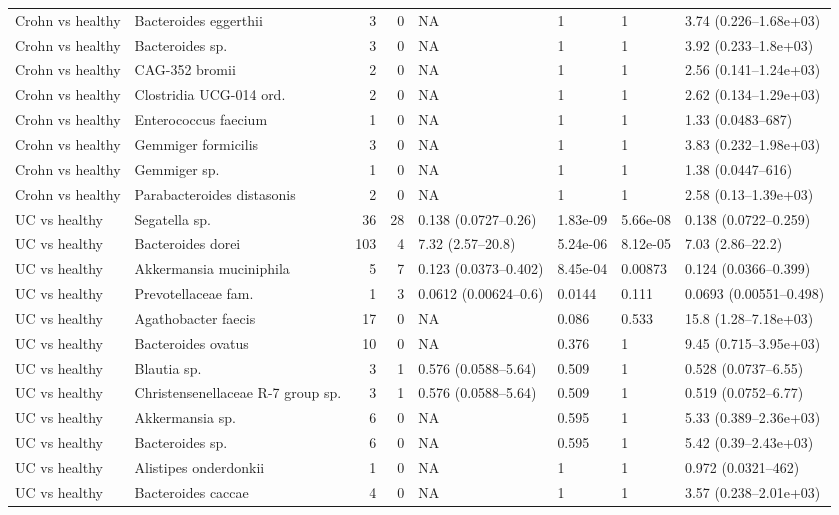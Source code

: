 \begin{longtable}{@{} p{} p{} r r p{} p{} p{} p{} @{}}
Crohn vs healthy & Bacteroides eggerthii & 3 & 0 & NA & 1 & 1 & 3.74 (0.226--1.68e+03) \\
Crohn vs healthy & Bacteroides sp. & 3 & 0 & NA & 1 & 1 & 3.92 (0.233--1.8e+03) \\
Crohn vs healthy & CAG-352 bromii & 2 & 0 & NA & 1 & 1 & 2.56 (0.141--1.24e+03) \\
Crohn vs healthy & Clostridia UCG-014 ord. & 2 & 0 & NA & 1 & 1 & 2.62 (0.134--1.29e+03) \\
Crohn vs healthy & Enterococcus faecium & 1 & 0 & NA & 1 & 1 & 1.33 (0.0483--687) \\
Crohn vs healthy & Gemmiger formicilis & 3 & 0 & NA & 1 & 1 & 3.83 (0.232--1.98e+03) \\
Crohn vs healthy & Gemmiger sp. & 1 & 0 & NA & 1 & 1 & 1.38 (0.0447--616) \\
Crohn vs healthy & Parabacteroides distasonis & 2 & 0 & NA & 1 & 1 & 2.58 (0.13--1.39e+03) \\
UC vs healthy & Segatella sp. & 36 & 28 & 0.138 (0.0727--0.26) & 1.83e-09 & 5.66e-08 & 0.138 (0.0722--0.259) \\
UC vs healthy & Bacteroides dorei & 103 & 4 & 7.32 (2.57--20.8) & 5.24e-06 & 8.12e-05 & 7.03 (2.86--22.2) \\
UC vs healthy & Akkermansia muciniphila & 5 & 7 & 0.123 (0.0373--0.402) & 8.45e-04 & 0.00873 & 0.124 (0.0366--0.399) \\
UC vs healthy & Prevotellaceae fam. & 1 & 3 & 0.0612 (0.00624--0.6) & 0.0144 & 0.111 & 0.0693 (0.00551--0.498) \\
UC vs healthy & Agathobacter faecis & 17 & 0 & NA & 0.086 & 0.533 & 15.8 (1.28--7.18e+03) \\
UC vs healthy & Bacteroides ovatus & 10 & 0 & NA & 0.376 & 1 & 9.45 (0.715--3.95e+03) \\
UC vs healthy & Blautia sp. & 3 & 1 & 0.576 (0.0588--5.64) & 0.509 & 1 & 0.528 (0.0737--6.55) \\
UC vs healthy & Christensenellaceae R-7 group sp. & 3 & 1 & 0.576 (0.0588--5.64) & 0.509 & 1 & 0.519 (0.0752--6.77) \\
UC vs healthy & Akkermansia sp. & 6 & 0 & NA & 0.595 & 1 & 5.33 (0.389--2.36e+03) \\
UC vs healthy & Bacteroides sp. & 6 & 0 & NA & 0.595 & 1 & 5.42 (0.39--2.43e+03) \\
UC vs healthy & Alistipes onderdonkii & 1 & 0 & NA & 1 & 1 & 0.972 (0.0321--462) \\
UC vs healthy & Bacteroides caccae & 4 & 0 & NA & 1 & 1 & 3.57 (0.238--2.01e+03) \\

\end{longtable}
